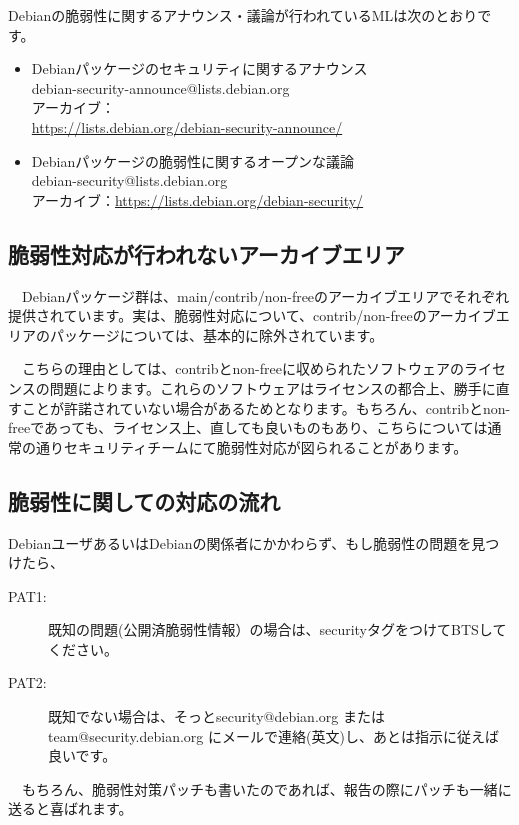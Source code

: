 \documentclass[mingoth,a4paper]{jsarticle}
\begin{document}
 Debianの脆弱性に関するアナウンス・議論が行われているMLは次のとおりです。

 \begin{itemize}
 \item  Debianパッケージのセキュリティに関するアナウンス\\
debian-security-announce@lists.debian.org\\
アーカイブ：\\
\url{https://lists.debian.org/debian-security-announce/}
 \item  Debianパッケージの脆弱性に関するオープンな議論\\
debian-security@lists.debian.org\\
アーカイブ：\url{https://lists.debian.org/debian-security/}
 \end{itemize}

\subsection{脆弱性対応が行われないアーカイブエリア}

　Debianパッケージ群は、main/contrib/non-freeのアーカイブエリアでそれぞれ提供されています。実は、脆弱性対応について、contrib/non-freeのアーカイブエリアのパッケージについては、基本的に除外されています。

　こちらの理由としては、contribとnon-freeに収められたソフトウェアのライセンスの問題によります。これらのソフトウェアはライセンスの都合上、勝手に直すことが許諾されていない場合があるためとなります。もちろん、contribとnon-freeであっても、ライセンス上、直しても良いものもあり、こちらについては通常の通りセキュリティチームにて脆弱性対応が図られることがあります。

\subsection{脆弱性に関しての対応の流れ}

 DebianユーザあるいはDebianの関係者にかかわらず、もし脆弱性の問題を見つけたら、
\begin{description}
\item [PAT1:] 既知の問題(公開済脆弱性情報）の場合は、securityタグをつけてBTSしてください。
\item [PAT2:] 既知でない場合は、そっとsecurity@debian.org またはteam@security.debian.org にメールで連絡(英文)し、あとは指示に従えば良いです。
\end{description}

　もちろん、脆弱性対策パッチも書いたのであれば、報告の際にパッチも一緒に送ると喜ばれます。
\end{document}
